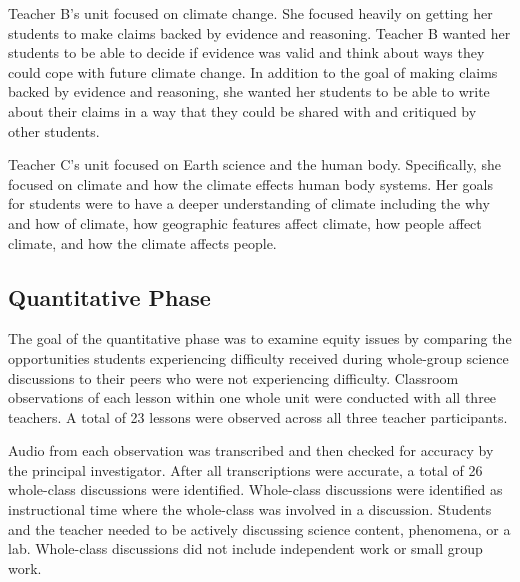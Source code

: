 \documentclass{sig-alternate} %
\begin{document}
\begin{large}
Teacher B’s unit focused on climate change. She focused heavily on getting her students to make claims backed by evidence and reasoning. Teacher B wanted her students to be able to decide if evidence was valid and think about ways they could cope with future climate change. In addition to the goal of making claims backed by evidence and reasoning, she wanted her students to be able to write about their claims in a way that they could be shared with and critiqued by other students. 

Teacher C’s unit focused on Earth science and the human body. Specifically, she focused on climate and how the climate effects human body systems. Her goals for students were to have a deeper understanding of climate including the why and how of climate, how geographic features affect climate, how people affect climate, and how the climate affects people. 

\subsection*{Quantitative Phase}

The goal of the quantitative phase was to examine equity issues by comparing the opportunities students experiencing difficulty received during whole-group science discussions to their peers who were not experiencing difficulty. Classroom observations of each lesson within one whole unit were conducted with all three teachers. A total of 23 lessons were observed across all three teacher participants.

Audio from each observation was transcribed and then checked for accuracy by the principal investigator. After all transcriptions were accurate, a total of 26 whole-class discussions were identified. Whole-class discussions were identified as instructional time where the whole-class was involved in a discussion. Students and the teacher needed to be actively discussing science content, phenomena, or a lab. Whole-class discussions did not include independent work or small group work. 


\end{large}
\end{document}
